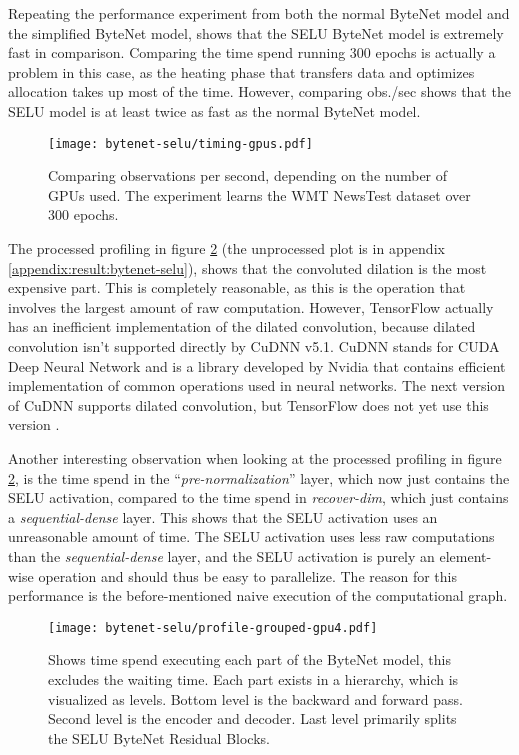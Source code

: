 Repeating the performance experiment from both the normal ByteNet model and the simplified ByteNet model, shows that the SELU ByteNet model is extremely fast in comparison. Comparing the time spend running 300 epochs is actually a problem in this case, as the heating phase that transfers data and optimizes allocation takes up most of the time. However, comparing obs./sec shows that the SELU model is at least twice as fast as the normal ByteNet model.

\begin{figure}[h]
    \centering
    \texttt{[image: bytenet-selu/timing-gpus.pdf]}
    \caption{Comparing observations per second, depending on the number of GPUs used. The experiment learns the WMT NewsTest dataset over 300 epochs.}
    \label{fig:result:selu-bytenet:timing-gpus}
\end{figure}

The processed profiling in figure \ref{fig:result:selu-bytenet:profile-grouped} (the unprocessed plot is in appendix \ref{appendix:result:bytenet-selu}), shows that the convoluted dilation is the most expensive part. This is completely reasonable, as this is the operation that involves the largest amount of raw computation. However, TensorFlow actually has an inefficient implementation of the dilated convolution, because dilated convolution isn't supported directly by CuDNN v5.1. CuDNN stands for CUDA Deep Neural Network and is a library developed by Nvidia that contains efficient implementation of common operations used in neural networks. The next version of CuDNN supports dilated convolution, but TensorFlow does not yet use this version \cite{nvidia-cudnn}.

Another interesting observation when looking at the processed profiling in figure \ref{fig:result:selu-bytenet:profile-grouped}, is the time spend in the ``\textit{pre-normalization}'' layer, which now just contains the SELU activation, compared to the time spend in \textit{recover-dim}, which just contains a \textit{sequential-dense} layer. This shows that the SELU activation uses an unreasonable amount of time. The SELU activation uses less raw computations than the \textit{sequential-dense} layer, and the SELU activation is purely an element-wise operation and should thus be easy to parallelize. The reason for this performance is the before-mentioned naive execution of the computational graph.

\begin{figure}[h]
    \centering
    \texttt{[image: bytenet-selu/profile-grouped-gpu4.pdf]}
    \caption{Shows time spend executing each part of the ByteNet model, this excludes the waiting time. Each part exists in a hierarchy, which is visualized as levels. Bottom level is the backward and forward pass. Second level is the encoder and decoder. Last level primarily splits the SELU ByteNet Residual Blocks.}
    \label{fig:result:selu-bytenet:profile-grouped}
\end{figure}

